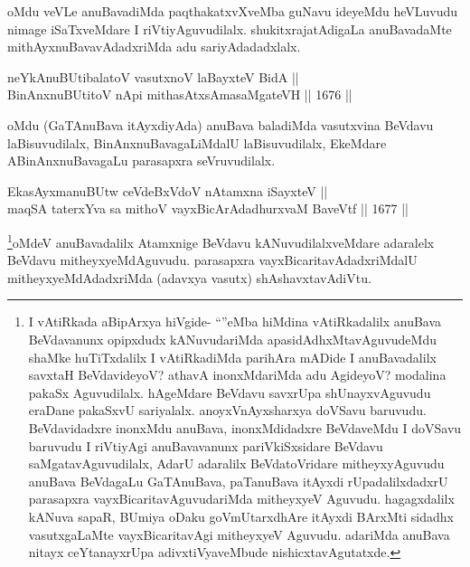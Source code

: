 \begin{artha}
oMdu veVLe anuBavadiMda paqthakatxvXveMba guNavu ideyeMdu heVLuvudu nimage iSaTxveMdare I riVtiyAguvudilalx. shukitxrajatAdigaLa anuBavadaMte mithAyxnuBavavAdadxriMda adu sariyAdadadxlalx.
\end{artha}

\begin{shl}
neYkAnuBUtibalatoV vasutxnoV laBayxteV BidA || \\
BinAnxnuBUtitoV nApi mithasAtxsAmasaMgateVH ||  1676 ||  
\end{shl}

\begin{artha}
oMdu (GaTAnuBava itAyxdiyAda) anuBava baladiMda vasutxvina BeVdavu laBisuvudilalx, BinAnxnuBavagaLiMdalU laBisuvudilalx, EkeMdare ABinAnxnuBavagaLu parasapxra seVruvudilalx.
\end{artha}

\begin{shl}
EkasAyxmanuBUtw ceVdeBxVdoV nA\s \s tamxna iSayxteV || \\
maqSA taterxYva sa mithoV vayxBicArAdadhurxvaM BaveVtf ||  1677 ||  
\end{shl}

\begin{artha}
\footnote{I vAtiRkada aBipArxya hiVgide- ``\stext''eMba hiMdina vAtiRkadalilx anuBava BeVdavanunx opipxdudx kANuvudariMda apasidAdhxMtavAguvudeMdu shaMke huTiTxdalilx I vAtiRkadiMda parihAra mADide I anuBavadalilx savxtaH BeVdavideyoV? athavA inonxMdariMda adu AgideyoV? modalina pakaSx Aguvudilalx. hAgeMdare BeVdavu savxrUpa shUnayxvAguvudu eraDane pakaSxvU sariyalalx. anoyxVnAyxsharxya doVSavu baruvudu. BeVdavidadxre inonxMdu anuBava, inonxMdidadxre BeVdaveMdu I doVSavu baruvudu I riVtiyAgi anuBavavanunx pariVkiSxsidare BeVdavu saMgatavAguvudilalx, AdarU adaralilx BeVdatoVridare mitheyxyAguvudu anuBava BeVdagaLu GaTAnuBava, paTanuBava itAyxdi rUpadalilxdadxrU parasapxra vayxBicaritavAguvudariMda mitheyxyeV Aguvudu. hagagxdalilx kANuva sapaR, BUmiya oDaku goVmUtarxdhAre itAyxdi BArxMti sidadhx vasutxgaLaMte vayxBicaritavAgi mitheyxyeV Aguvudu. adariMda anuBava nitayx ceYtanayxrUpa adivxtiVyaveMbude nishicxtavAgutatxde.}oMdeV anuBavadalilx Atamxnige BeVdavu kANuvudilalxveMdare adaralelx BeVdavu mitheyxyeMdAguvudu. parasapxra vayxBicaritavAdadxriMdalU mitheyxyeMdAdadxriMda (adavxya vasutx) shAshavxtavAdiVtu.
\end{artha}


